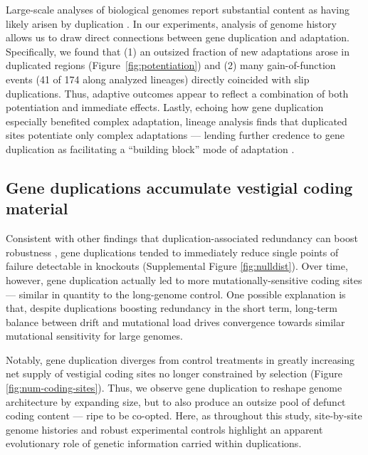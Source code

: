 Large-scale analyses of biological genomes report substantial content as having likely arisen by duplication \citep{teichmann_structural_1998,Teichmann:2004cz}.
In our experiments, analysis of genome history allows us to draw direct connections between gene duplication and adaptation.
Specifically, we found that (1) an outsized fraction of new adaptations arose in duplicated regions (Figure~\ref{fig:potentiation}) and (2) many gain-of-function events (41 of 174 along analyzed lineages) directly coincided with slip duplications.
Thus, adaptive outcomes appear to reflect a combination of both potentiation and immediate effects.
Lastly, echoing how gene duplication especially benefited complex adaptation, lineage analysis finds that duplicated sites potentiate only complex adaptations --- lending further credence to gene duplication as facilitating a ``building block'' mode of adaptation \citep{Jacob1977}.

\subsection{Gene duplications accumulate vestigial coding material}

Consistent with other findings that duplication-associated redundancy can boost robustness \citep{Lynch2000}, gene duplications tended to immediately reduce single points of failure detectable in knockouts (Supplemental Figure \ref{fig:nulldist}).
Over time, however, gene duplication actually led to more mutationally-sensitive coding sites --- similar in quantity to the long-genome control.
One possible explanation is that, despite duplications boosting redundancy in the short term, long-term balance between drift and mutational load drives convergence towards similar mutational sensitivity for large genomes.

Notably, gene duplication diverges from control treatments in greatly increasing net supply of vestigial coding sites no longer constrained by selection (Figure \ref{fig:num-coding-sites}).
Thus, we observe gene duplication to reshape genome architecture by expanding size, but to also produce an outsize pool of defunct coding content --- ripe to be co-opted.
Here, as throughout this study, site-by-site genome histories and robust experimental controls highlight an apparent evolutionary role of genetic information carried within duplications.
